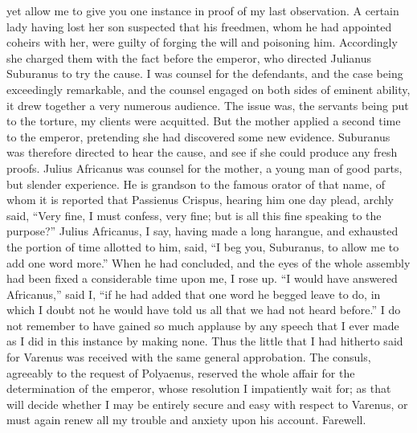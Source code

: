 yet allow me to give you one instance in proof of my last observation. A
certain lady having lost her son suspected that his freedmen, whom he had
appointed coheirs with her, were guilty of forging the will and poisoning
him. Accordingly she charged them with the fact before the emperor, who
directed Julianus Suburanus to try the cause. I was counsel for the
defendants, and the case being exceedingly remarkable, and the counsel
engaged on both sides of eminent ability, it drew together a very numerous
audience. The issue was, the servants being put to the torture, my clients
were acquitted. But the mother applied a second time to the emperor,
pretending she had discovered some new evidence. Suburanus was therefore
directed to hear the cause, and see if she could produce any fresh proofs.
Julius Africanus was counsel for the mother, a young man of good parts,
but slender experience. He is grandson to the famous orator of that name,
of whom it is reported that Passienus Crispus, hearing him one day plead,
archly said, ``Very fine, I must confess, very fine; but is all this fine
speaking to the purpose?'' Julius Africanus, I say, having made a long
harangue, and exhausted the portion of time allotted to him, said, ``I beg
you, Suburanus, to allow me to add one word more.'' When he had concluded,
and the eyes of the whole assembly had been fixed a considerable time upon
me, I rose up. ``I would have answered Africanus,'' said I, ``if he had added
that one word he begged leave to do, in which I doubt not he would have
told us all that we had not heard before.'' I do not remember to have
gained so much applause by any speech that I ever made as I did in this
instance by making none. Thus the little that I had hitherto said for
Varenus was received with the same general approbation. The consuls,
agreeably to the request of Polyaenus, reserved the whole affair for the
determination of the emperor, whose resolution I impatiently wait for; as
that will decide whether I may be entirely secure and easy with respect to
Varenus, or must again renew all my trouble and anxiety upon his account.
Farewell.


